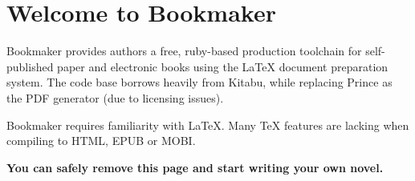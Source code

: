 \section{Welcome to Bookmaker}

Bookmaker provides authors a free, ruby-based production toolchain for self-published paper and electronic books using the LaTeX document preparation system. The code base borrows heavily from Kitabu, while replacing Prince as the PDF generator (due to licensing issues).

Bookmaker requires familiarity with LaTeX. Many TeX features are lacking when compiling to HTML, EPUB or MOBI.

\textbf{You can safely remove this page and start writing your own novel.}
